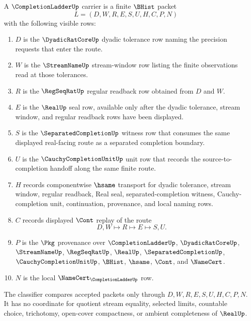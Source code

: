 \begin{definition}
\label{def:completion-ladder-carrier}
A $\CompletionLadderUp$ carrier is a finite $\BHist$ packet
$$
L=(D,W,R,E,S,U,H,C,P,N)
$$
with the following visible rows:
\begin{enumerate}
\item $D$ is the $\DyadicRatCoreUp$ dyadic tolerance row naming the precision requests that enter the route.
\item $W$ is the $\StreamNameUp$ stream-window row listing the finite observations read at those tolerances.
\item $R$ is the $\RegSeqRatUp$ regular readback row obtained from $D$ and $W$.
\item $E$ is the $\RealUp$ seal row, available only after the dyadic tolerance, stream window, and regular readback rows have been displayed.
\item $S$ is the $\SeparatedCompletionUp$ witness row that consumes the same displayed real-facing route as a separated completion boundary.
\item $U$ is the $\CauchyCompletionUnitUp$ unit row that records the source-to-completion handoff along the same finite route.
\item $H$ records componentwise $\hsame$ transport for dyadic tolerance, stream window, regular readback, Real seal, separated-completion witness, Cauchy-completion unit, continuation, provenance, and local naming rows.
\item $C$ records displayed $\Cont$ replay of the route
$$
D,W \longmapsto R \longmapsto E \longmapsto S,U .
$$
\item $P$ is the $\Pkg$ provenance over $\CompletionLadderUp$, $\DyadicRatCoreUp$, $\StreamNameUp$, $\RegSeqRatUp$, $\RealUp$, $\SeparatedCompletionUp$, $\CauchyCompletionUnitUp$, $\BHist$, $\hsame$, $\Cont$, and $\NameCert$.
\item $N$ is the local $\NameCert_{\CompletionLadderUp}$ row.
\end{enumerate}
The classifier compares accepted packets only through $D,W,R,E,S,U,H,C,P,N$. It has no coordinate for quotient stream equality, selected limits, countable choice, trichotomy, open-cover compactness, or ambient completeness of $\RealUp$.
\end{definition}

